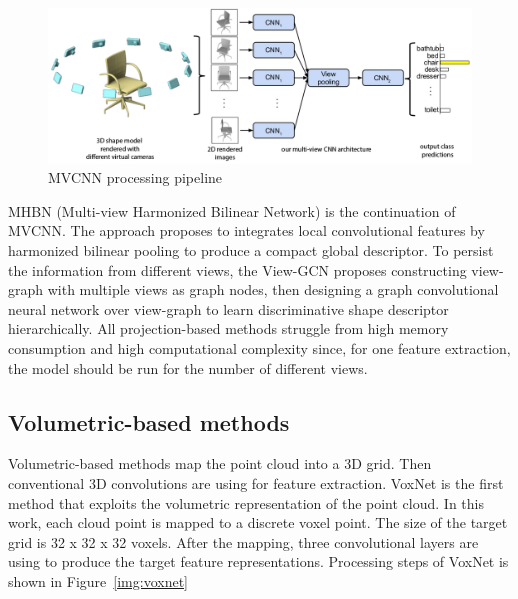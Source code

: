 \begin{figure}[htbp]
    \centerline{\includegraphics[scale=0.4]{Figures/mvcnn.png}}
    \caption{MVCNN processing pipeline  \parencite{su_multi-view_2015}}
    \label{img:mvcnn}
\end{figure}

MHBN \parencite{yu_multi-view_2018} (Multi-view Harmonized Bilinear Network) is the continuation of MVCNN. The approach proposes to integrates local convolutional features by harmonized bilinear pooling to produce a compact global descriptor.
To persist the information from different views, the View-GCN \parencite{wei_view-gcn_2020} proposes constructing view-graph with multiple views as graph nodes, then designing a graph convolutional neural network over view-graph to learn discriminative shape descriptor hierarchically.
All projection-based methods struggle from high memory consumption and high computational complexity since, for one feature extraction, the model should be run for the number of different views.

\subsection{Volumetric-based methods} 
Volumetric-based methods map the point cloud into a 3D grid. Then conventional 3D convolutions are using for feature extraction.
VoxNet \parencite{maturana_voxnet_2015} is the first method that exploits the volumetric representation of the point cloud. In this work, each cloud point is mapped to a discrete voxel point. The size of the target grid is 32 x 32 x 32 voxels. After the mapping, three convolutional layers are using to produce the target feature representations. Processing steps of VoxNet is shown in Figure~\ref{img:voxnet}

